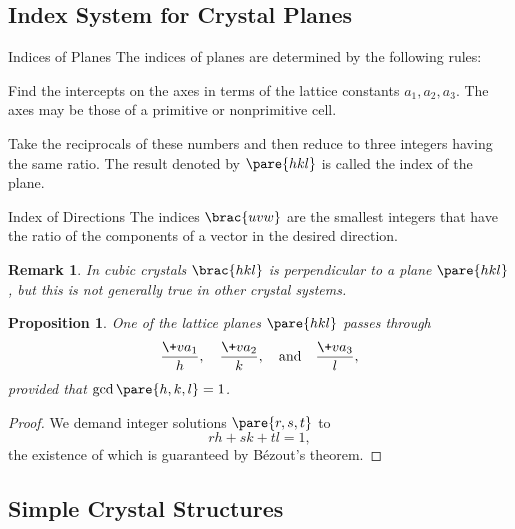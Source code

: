 \documentclass[hidelinks]{article}
\newtheorem{remark}{Remark}
\newtheorem{proposition}{Proposition}
\begin{document}

\subsection{Index System for Crystal Planes} %
\label{sub:index_system_for_crystal_planes}

\begin{termdef}{Indices of Planes}
    The indices of planes are determined by the following rules:
    \begin{citemize}
        \item Find the intercepts on the axes in terms of the lattice constants $a_1, a_2, a_3$. The axes may be those of a primitive or nonprimitive cell.
        \item Take the reciprocals of these numbers and then reduce to three integers having the same ratio. The result denoted by $\pare{hkl}$ is called the index of the plane.
    \end{citemize}
\end{termdef}
\begin{termdef}{Index of Directions}
    The indices $\brac{uvw}$ are the smallest integers that have the ratio of the components of a vector in the desired direction.
\end{termdef}
\begin{remark}
    In cubic crystals $\brac{hkl}$ is perpendicular to a plane $\pare{hkl}$, but this is not generally true in other crystal systems.
\end{remark}
\begin{finale}
    \begin{proposition}
        One of the lattice planes $\pare{hkl}$ passes through
        \[ \frac{\+va_1}{h},\quad \frac{\+va_2}{k},\quad \text{and}\quad \frac{\+va_3}{l}, \]
        provided that $\gcd\pare{h,k,l} = 1$.
    \end{proposition}
\end{finale}
\begin{proof}
    We demand integer solutions $\pare{r,s,t}$ to
    \[ rh + sk + tl = 1, \]
    the existence of which is guaranteed by B\'ezout's theorem.
\end{proof}


\subsection{Simple Crystal Structures} %
\label{sub:simple_crystal_structures}
\end{document}
